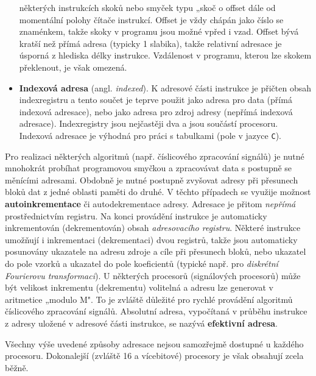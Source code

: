\begin{itemize}
                některých instrukcích skoků nebo smyček typu „skoč o offset dále od momentální 
                polohy čítače instrukcí. Offset je vždy chápán jako číslo se znaménkem, takže skoky 
                v programu jsou možné vpřed i vzad. Offset bývá kratší než přímá adresa (typicky 1 
                slabika), takže relativní adresace je úsporná z hlediska délky instrukce. 
                Vzdálenost v programu, kterou lze skokem překlenout, je však omezená.
          \item \textbf{Indexová adresa} (angl. \emph{indexed}). K adresové části instrukce je  
                přičten obsah indexregistru a tento součet je teprve použit jako adresa pro data 
                (přímá indexová adresace), nebo jako adresa pro zdroj adresy (nepřímá indexová 
                adresace). Indexregistry jsou nejčastěji dva a jsou součástí procesoru. Indexová 
                adresace je výhodná pro práci s tabulkami (pole v jazyce \texttt{C}).
        \end{itemize}
        
        Pro realizaci některých algoritmů (např. číslicového zpracování signálů) je nutné mnohokrát 
        probíhat programovou smyčkou a zpracovávat data s postupně se měnícími adresami. Obdobně je 
        nutné postupně zvyšovat adresy při přesunech bloků dat z jedné oblasti paměti do druhé. V 
        těchto případech se využije možnost \textbf{autoinkrementace} či autodekrementace adresy. 
        Adresace je přitom \emph{nepřímá} prostřednictvím registru. Na konci provádění instrukce je 
        automaticky inkrementován (dekrementován) obsah \emph{adresovacího registru}. Některé 
        instrukce umožňují i inkrementaci (dekrementaci) dvou registrů, takže jsou automaticky 
        posunovány ukazatele na adresu zdroje a cíle při přesunech bloků, nebo ukazatel do pole 
        vzorků a ukazatel do pole koeficientů (typické např. pro \emph{diskrétní Fourierovu 
        transformaci}). U některých procesorů (signálových procesorů) může být velikost inkrementu 
        (dekrementu) volitelná a adresu lze generovat v aritmetice „modulo M". To je zvláště 
        důležité pro rychlé provádění algoritmů číslicového zpracování signálů. Absolutní adresa, 
        vypočítaná v průběhu instrukce z adresy uložené v adresové části instrukce, se nazývá 
        \textbf{efektivní adresa}.
        
        Všechny výše uvedené způsoby adresace nejsou samozřejmě dostupné u každého procesoru. 
        Dokonalejší (zvláště 16 a vícebitové) procesory je však obsahují zcela běžně.
        
